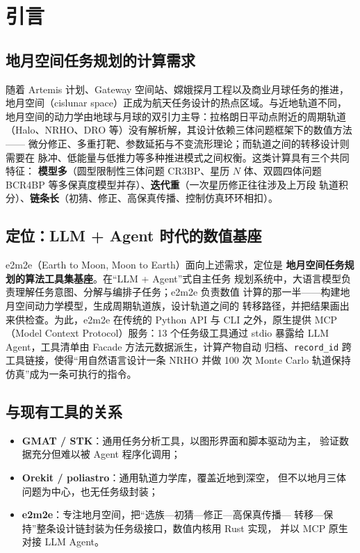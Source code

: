 \section{引言}

\subsection{地月空间任务规划的计算需求}

随着 Artemis 计划、Gateway 空间站、嫦娥探月工程以及商业月球任务的推进，
地月空间（cislunar space）正成为航天任务设计的热点区域。与近地轨道不同，
地月空间的动力学由地球与月球的双引力主导：拉格朗日平动点附近的周期轨道
（Halo、NRHO、DRO 等）没有解析解，其设计依赖三体问题框架下的数值方法——
微分修正、多重打靶、参数延拓与不变流形理论；而轨道之间的转移设计则需要在
脉冲、低能量与低推力等多种推进模式之间权衡。这类计算具有三个共同特征：
\textbf{模型多}（圆型限制性三体问题 CR3BP、星历 $N$ 体、双圆四体问题
BCR4BP 等多保真度模型并存）、\textbf{迭代重}（一次星历修正往往涉及上万段
轨道积分）、\textbf{链条长}（初猜、修正、高保真传播、控制仿真环环相扣）。

\subsection{定位：LLM + Agent 时代的数值基座}

e2m2e（Earth to Moon, Moon to Earth）面向上述需求，定位是
\textbf{地月空间任务规划的算法工具集基座}。在“LLM + Agent”式自主任务
规划系统中，大语言模型负责理解任务意图、分解与编排子任务；e2m2e 负责数值
计算的那一半——构建地月空间动力学模型，生成周期轨道族，设计轨道之间的
转移路径，并把结果画出来供检查。为此，e2m2e 在传统的 Python API 与 CLI
之外，原生提供 MCP（Model Context Protocol）服务：13 个任务级工具通过
stdio 暴露给 LLM Agent，工具清单由 Facade 方法元数据派生，计算产物自动
归档、\texttt{record\_id} 跨工具链接，使得“用自然语言设计一条 NRHO 并做
100 次 Monte Carlo 轨道保持仿真”成为一条可执行的指令。

\subsection{与现有工具的关系}

\begin{itemize}
  \item \textbf{GMAT / STK}：通用任务分析工具，以图形界面和脚本驱动为主，
        验证数据充分但难以被 Agent 程序化调用；
  \item \textbf{Orekit / poliastro}：通用轨道力学库，覆盖近地到深空，
        但不以地月三体问题为中心，也无任务级封装；
  \item \textbf{e2m2e}：专注地月空间，把“选族—初猜—修正—高保真传播—
        转移—保持”整条设计链封装为任务级接口，数值内核用 Rust 实现，
        并以 MCP 原生对接 LLM Agent。
\end{itemize}

